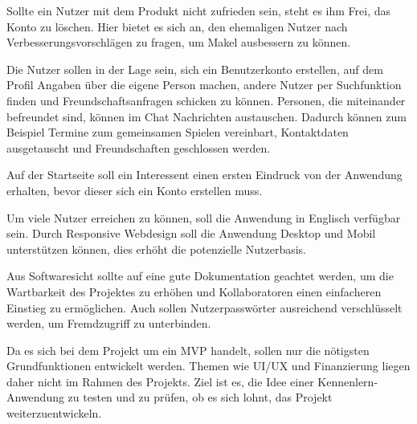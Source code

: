 Sollte ein Nutzer mit dem Produkt nicht zufrieden sein, steht es ihm Frei, das Konto zu löschen.
Hier bietet es sich an, den ehemaligen Nutzer nach Verbesserungsvorschlägen zu fragen, um Makel ausbessern zu können.

Die Nutzer sollen in der Lage sein, sich ein Benutzerkonto erstellen, auf dem Profil Angaben über die eigene Person machen, andere Nutzer per Suchfunktion finden und Freundschaftsanfragen schicken zu können.
Personen, die miteinander befreundet sind, können im Chat Nachrichten austauschen.
Dadurch können zum Beispiel Termine zum gemeinsamen Spielen vereinbart, Kontaktdaten ausgetauscht und Freundschaften geschlossen werden.

Auf der Startseite soll ein Interessent einen ersten Eindruck von der Anwendung erhalten, bevor dieser sich ein Konto erstellen muss.

Um viele Nutzer erreichen zu können, soll die Anwendung in Englisch verfügbar sein.
Durch Responsive Webdesign %
soll die Anwendung Desktop und Mobil unterstützen können, dies erhöht die potenzielle Nutzerbasis.

Aus Softwaresicht sollte auf eine gute Dokumentation geachtet werden, um die Wartbarkeit des Projektes zu erhöhen und Kollaboratoren einen einfacheren Einstieg zu ermöglichen.
Auch sollen Nutzerpasswörter ausreichend verschlüsselt werden, um Fremdzugriff zu unterbinden.

Da es sich bei dem Projekt um ein MVP handelt, sollen nur die nötigsten Grundfunktionen entwickelt werden.
Themen wie UI/UX und Finanzierung liegen daher nicht im Rahmen des Projekts.
Ziel ist es, die Idee einer Kennenlern-Anwendung zu testen und zu prüfen, ob es sich lohnt, das Projekt weiterzuentwickeln. 